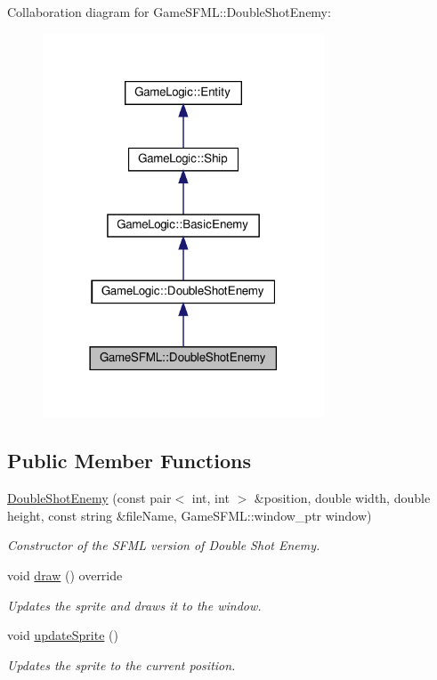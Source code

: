 Collaboration diagram for Game\+S\+F\+ML\+:\+:Double\+Shot\+Enemy\+:
\nopagebreak
\begin{figure}[H]
\begin{center}
\leavevmode
\includegraphics[width=237pt]{classGameSFML_1_1DoubleShotEnemy__coll__graph}
\end{center}
\end{figure}
\subsection*{Public Member Functions}
\begin{DoxyCompactItemize}
\item 
\hyperlink{classGameSFML_1_1DoubleShotEnemy_aac02c60e67312c1b15ccae83c4d2a4ea}{Double\+Shot\+Enemy} (const pair$<$ int, int $>$ \&position, double width, double height, const string \&file\+Name, Game\+S\+F\+M\+L\+::window\+\_\+ptr window)
\begin{DoxyCompactList}\small\item\em Constructor of the S\+F\+ML version of Double Shot Enemy. \end{DoxyCompactList}\item 
void \hyperlink{classGameSFML_1_1DoubleShotEnemy_a3d30aebbab50ad019207d6ba91ab0b5f}{draw} () override
\begin{DoxyCompactList}\small\item\em Updates the sprite and draws it to the window. \end{DoxyCompactList}\item 
void \hyperlink{classGameSFML_1_1DoubleShotEnemy_a9f93afa5fb33282829667f49f4fc48b9}{update\+Sprite} ()
\begin{DoxyCompactList}\small\item\em Updates the sprite to the current position. \end{DoxyCompactList}\end{DoxyCompactItemize}
